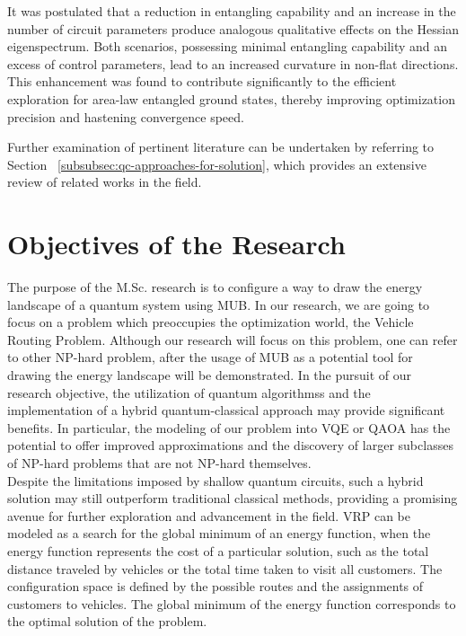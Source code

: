 \documentclass[12pt, a4paper]{article}
\begin{document}
    It was postulated that a reduction in entangling capability and an increase in the number of circuit parameters 
    produce analogous qualitative effects on the Hessian eigenspectrum. 
    Both scenarios, possessing minimal entangling capability and an excess of control parameters, 
    lead to an increased curvature in non-flat directions. This enhancement was found to contribute 
    significantly to the efficient exploration for area-law entangled ground states, thereby improving 
    optimization precision and hastening convergence speed.


    Further examination of pertinent literature can be undertaken by referring to Section ~\ref{subsubsec:qc-approaches-for-solution},
    which provides an extensive review of related works in the field.

    \section{Objectives of the Research}\label{sec:objectives-of-the-research}
    The purpose of the M.Sc. research is to configure a way to draw the energy landscape of a quantum system using MUB.
    In our research, we are going to focus on a problem which preoccupies the optimization world, the Vehicle Routing Problem.
    Although our research will focus on this problem, one can refer to other NP-hard problem, after the usage of MUB as
    a potential tool for drawing the energy landscape will be demonstrated.
    In the pursuit of our research objective, the utilization of quantum algorithmss and the implementation of a hybrid
    quantum-classical approach may provide significant benefits.
    In particular, the modeling of our problem into
    VQE or QAOA has the potential to offer
    improved approximations and the discovery of larger subclasses of NP-hard problems that are not NP-hard themselves.\\
    Despite the limitations imposed by shallow quantum circuits, such a hybrid solution may still outperform traditional
    classical methods, providing a promising avenue for further exploration and advancement in the field.
    VRP can be modeled as a search for the global minimum of an energy function, when the energy function represents
    the cost of a particular solution, such as the total distance traveled by vehicles or the total time taken to visit
    all customers.
    The configuration space is defined by the possible routes and the assignments of customers to vehicles.
    The global minimum of the energy function corresponds to the optimal solution of the problem\@.\\
\end{document}
